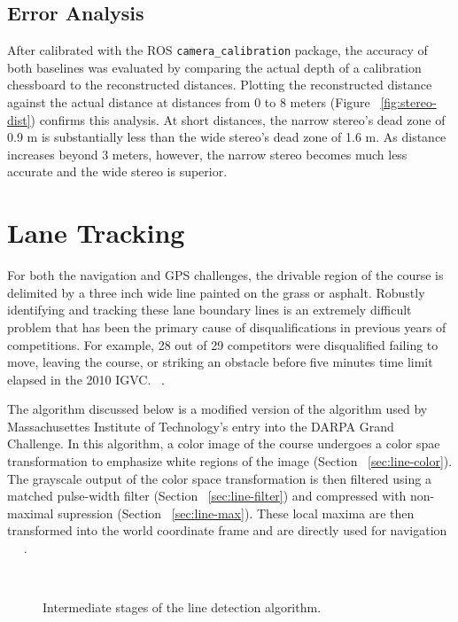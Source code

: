 \documentclass[11pt,twocolumn]{article}
\begin{document}
\subsection{Error Analysis}
\label{sec:stereo-error}
After calibrated with the ROS \texttt{camera\_calibration} package, the
accuracy of both baselines was evaluated by comparing the actual depth of a
calibration chessboard to the reconstructed distances. Plotting the
reconstructed distance against the actual distance at distances from 0 to 8
meters (Figure ~\ref{fig:stereo-dist}) confirms this analysis. At short
distances, the narrow stereo's dead zone of 0.9 m is substantially less than
the wide stereo's dead zone of 1.6 m. As distance increases beyond 3 meters,
however, the narrow stereo becomes much less accurate and the wide stereo is
superior.

\section{Lane Tracking}
\label{sec:line}
For both the navigation and GPS challenges, the drivable region of the course
is delimited by a three inch wide line painted on the grass or asphalt.
Robustly identifying and tracking these lane boundary lines is an extremely
difficult problem that has been the primary cause of disqualifications in
previous years of competitions. For example, 28 out of 29 competitors were
disqualified failing to move, leaving the course, or striking an obstacle
before five minutes time limit elapsed in the 2010 IGVC.
~\cite{igvc_results10}.

The algorithm discussed below is a modified version of the algorithm used by
Massachusettes Institute of Technology's entry into the DARPA Grand Challenge.
In this algorithm, a color image of the course undergoes a color spae
transformation to emphasize white regions of the image (Section
~\ref{sec:line-color}). The grayscale output of the color space transformation
is then filtered using a matched pulse-width filter (Section
~\ref{sec:line-filter}) and compressed with non-maximal supression (Section
~\ref{sec:line-max}). These local maxima are then transformed into the world
coordinate frame and are directly used for navigation ~\cite{huang_thesis}
~\cite{huang_paper}.

\begin{figure*}[t]
	\centering
	\\
	\caption{Intermediate stages of the line detection algorithm.}
	\label{fig:line-all}
\end{figure*}
\end{document}
